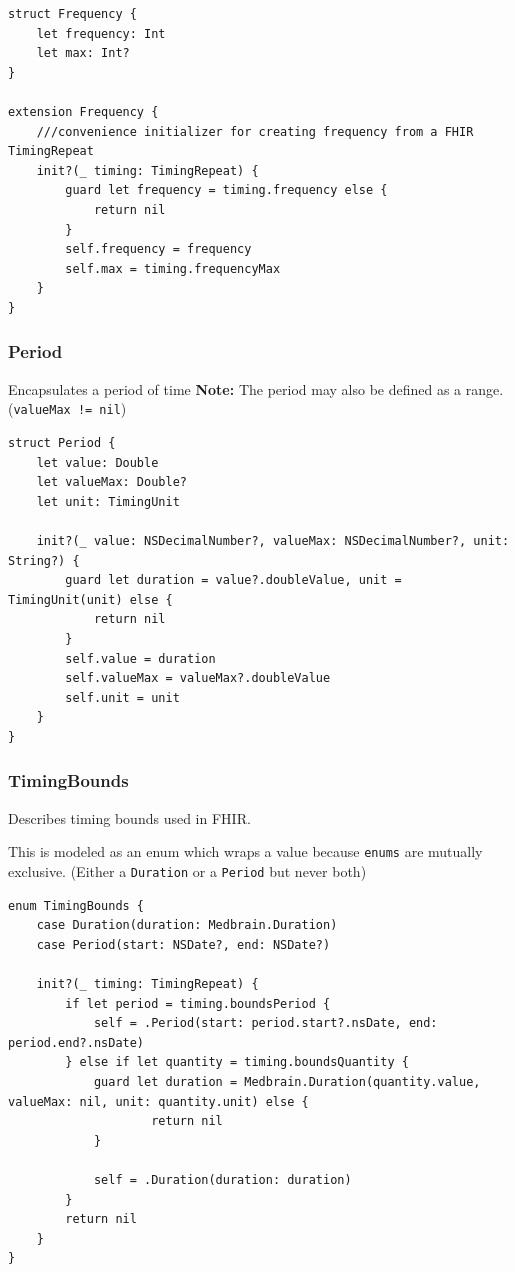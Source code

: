 \documentclass{article}
\begin{document}
\begin{verbatim}
struct Frequency {
    let frequency: Int
    let max: Int?
}

extension Frequency {
    ///convenience initializer for creating frequency from a FHIR TimingRepeat
    init?(_ timing: TimingRepeat) {
        guard let frequency = timing.frequency else {
            return nil
        }
        self.frequency = frequency
        self.max = timing.frequencyMax
    }
}
\end{verbatim}

\subsubsection{Period}\label{period}
Encapsulates a period of time \textbf{Note:} The period
may also be defined as a range. (\texttt{valueMax\ !=\ nil})

\begin{verbatim}
struct Period {
    let value: Double
    let valueMax: Double?
    let unit: TimingUnit

    init?(_ value: NSDecimalNumber?, valueMax: NSDecimalNumber?, unit: String?) {
        guard let duration = value?.doubleValue, unit = TimingUnit(unit) else {
            return nil
        }
        self.value = duration
        self.valueMax = valueMax?.doubleValue
        self.unit = unit
    }
}
\end{verbatim}

\subsubsection{TimingBounds}\label{timingbounds}
Describes timing bounds used in FHIR.

This is modeled as an enum which wraps a value because \texttt{enums} are mutually
exclusive. (Either a \texttt{Duration} or a \texttt{Period} but never
both)

\begin{verbatim}
enum TimingBounds {
    case Duration(duration: Medbrain.Duration)
    case Period(start: NSDate?, end: NSDate?)

    init?(_ timing: TimingRepeat) {
        if let period = timing.boundsPeriod {
            self = .Period(start: period.start?.nsDate, end: period.end?.nsDate)
        } else if let quantity = timing.boundsQuantity {
            guard let duration = Medbrain.Duration(quantity.value, valueMax: nil, unit: quantity.unit) else {
                    return nil
            }

            self = .Duration(duration: duration)
        }
        return nil
    }
}
\end{verbatim}
\end{document}
